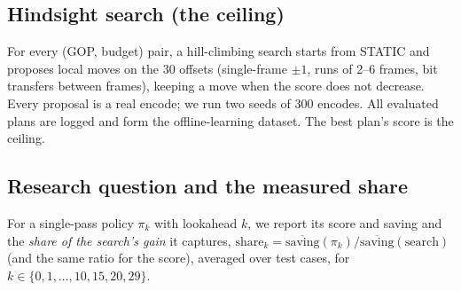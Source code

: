 \documentclass[conference]{IEEEtran}
\begin{document}
\subsection{Hindsight search (the ceiling)}
For every (GOP, budget) pair, a hill-climbing search starts from STATIC and proposes local moves on the 30 offsets (single-frame $\pm1$, runs of 2--6 frames, bit transfers between frames), keeping a move when the score does not decrease. Every proposal is a real encode; we run two seeds of 300 encodes. All evaluated plans are logged and form the offline-learning dataset. The best plan's score is the ceiling.

\subsection{Research question and the measured share}
For a single-pass policy $\pi_k$ with lookahead $k$, we report its score and saving and the \emph{share of the search's gain} it captures, $\text{share}_k = \overline{\text{saving}}(\pi_k)/\overline{\text{saving}}(\text{search})$ (and the same ratio for the score), averaged over test cases, for $k \in \{0,1,\dots,10,15,20,29\}$.

\end{document}

